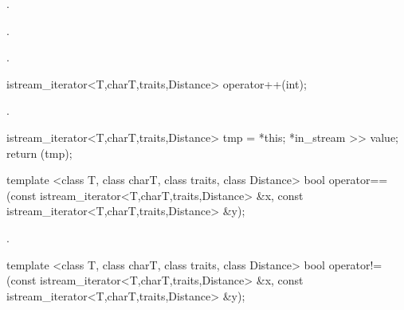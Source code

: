 \begin{itemdescr}
\pnum
\requires {}.

\pnum
\effects
{}.

\pnum
\returns
{}.
\end{itemdescr}

%
%
\begin{itemdecl}
istream_iterator<T,charT,traits,Distance> operator++(int);
\end{itemdecl}

\begin{itemdescr}
\pnum
\requires {}.

\pnum
\effects
\begin{codeblock}
istream_iterator<T,charT,traits,Distance> tmp = *this;
*in_stream >> value;
return (tmp);
\end{codeblock}
\end{itemdescr}

%
%
\begin{itemdecl}
template <class T, class charT, class traits, class Distance>
  bool operator==(const istream_iterator<T,charT,traits,Distance> &x,
                  const istream_iterator<T,charT,traits,Distance> &y);
\end{itemdecl}

\begin{itemdescr}
\pnum
\returns
{}.%
\end{itemdescr}

%
%
\begin{itemdecl}
template <class T, class charT, class traits, class Distance>
  bool operator!=(const istream_iterator<T,charT,traits,Distance> &x,
                  const istream_iterator<T,charT,traits,Distance> &y);
\end{itemdecl}

%
\begin{itemdescr}
\pnum
\returns
{}
\end{itemdescr}

